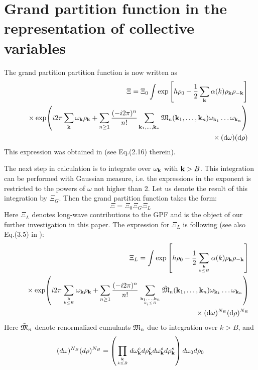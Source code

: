 \section{Grand partition function in the representation of collective variables}
The grand partition partition function is now written as 
\begin{eqnarray}
	\label{gpf_1}
	&&\Xi = \Xi_0 \int \exp \left[h \rho_0 - \frac12
	\sum\limits_{\bf k} \alpha (k) \rho_{\bf k}\rho_{-{\bf k}} \right]
	\\
	&&
	\quad{}\times
	\exp (i2\pi \sum\limits_{\bf k} \omega_{\bf k} \rho_{\bf k} + \sum_{n\ge 1} \frac{(-i2\pi)^n}{n!}\sum_{\vb{k}_1,\dotsc,\vb{k}_n} {\mathfrak M}_n(\vb{k}_1,\dotsc,\vb{k}_n) \omega_{\vb k_1}\dotsc\omega_{\vb{k}_n}) 
	\nonumber\\
	&&
	\quad{}\times ({\rm d}\omega) ({\rm d}\rho) 
	\nonumber
\end{eqnarray}
This expression was obtained in \cite{Yukh1990} (see Eq.(2.16) therein).

The next step in calculation is to integrate over $\omega_{\vb k}$ with $\vb{k}>B$. This integration can be performed with Gaussian measure, i.e. the expressions in the exponent is restricted to the powers of $\omega$ not higher than 2. Let us denote the result of this integration by $\Xi_G$. Then the grand partition function takes the form:
\begin{equation}
	\label{Xi_as_prod}
	\Xi = \Xi_0\Xi_G\Xi_L
\end{equation}
Here $\Xi_L$ denotes long-wave contributions to the GPF and is the object of our further investigation in this paper. The expression for $\Xi_L$ is following (see also Eq.(3.5) in \cite{Yukh1990}):
\begin{eqnarray}
	\label{gpf_l1}
	&&\Xi_L = \int \exp \left[h \rho_0 - \frac12
	\sum\limits_{\vb k \atop k\le B} \alpha (k) \rho_{\vb k}\rho_{-{\vb k}} \right]
	\\
	&&
	\quad{}\times
	\exp (i2\pi \sum\limits_{\vb k \atop k\le B} \omega_{\vb k} \rho_{\vb k} + \sum_{n\ge 1} \frac{(-i2\pi)^n}{n!}\sum_{\vb{k}_1,\dotsc,\vb{k}_n \atop k_i\le B} \tilde{\frak M}_n(\vb{k}_1,\dotsc,\vb{k}_n) \omega_{\vb k_1}\dotsc\omega_{\vb{k}_n})
	\nonumber\\
	&&\quad{}\times ({\rm d}\omega)^{N_B} ({\rm d}\rho)^{N_B} 
	\nonumber
\end{eqnarray}
Here $\tilde{\frak M}_n$ denote renormalized cumulants ${\frak M}_n$ due to integration over $k>B$, and
\begin{equation}
	(d\omega)^{N_B} (d\rho)^{N_B} = \left(\prod_{\vb k\atop k\le B}d\omega_{\vb k}^c d\rho_{\vb k}^c d\omega_{\vb k}^s d\rho_{\vb k}^s \right) d\omega_0 d\rho_0
\end{equation}

